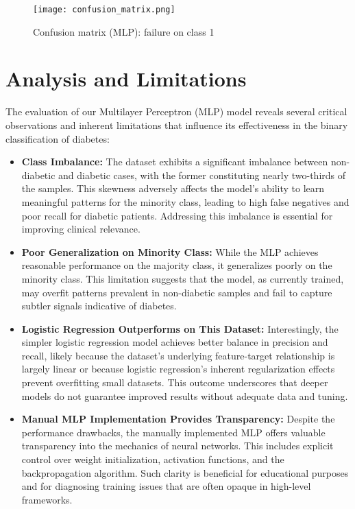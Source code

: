 \documentclass[12pt]{article}
\begin{document}
\begin{figure}[H]
\centering
\texttt{[image: confusion\_matrix.png]}
\caption{Confusion matrix (MLP): failure on class 1}
\end{figure}

\section{Analysis and Limitations}

The evaluation of our Multilayer Perceptron (MLP) model reveals several critical observations and inherent limitations that influence its effectiveness in the binary classification of diabetes:

\begin{itemize}
    \item \textbf{Class Imbalance:} The dataset exhibits a significant imbalance between non-diabetic and diabetic cases, with the former constituting nearly two-thirds of the samples. This skewness adversely affects the model's ability to learn meaningful patterns for the minority class, leading to high false negatives and poor recall for diabetic patients. Addressing this imbalance is essential for improving clinical relevance.
    
    \item \textbf{Poor Generalization on Minority Class:} While the MLP achieves reasonable performance on the majority class, it generalizes poorly on the minority class. This limitation suggests that the model, as currently trained, may overfit patterns prevalent in non-diabetic samples and fail to capture subtler signals indicative of diabetes.
    
    \item \textbf{Logistic Regression Outperforms on This Dataset:} Interestingly, the simpler logistic regression model achieves better balance in precision and recall, likely because the dataset’s underlying feature-target relationship is largely linear or because logistic regression’s inherent regularization effects prevent overfitting small datasets. This outcome underscores that deeper models do not guarantee improved results without adequate data and tuning.
    
    \item \textbf{Manual MLP Implementation Provides Transparency:} Despite the performance drawbacks, the manually implemented MLP offers valuable transparency into the mechanics of neural networks. This includes explicit control over weight initialization, activation functions, and the backpropagation algorithm. Such clarity is beneficial for educational purposes and for diagnosing training issues that are often opaque in high-level frameworks.
\end{itemize}
\end{document}
